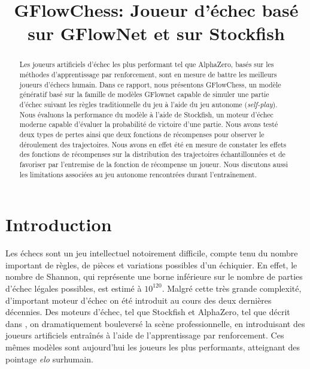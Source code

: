 \documentclass[11pt]{article}
\title{GFlowChess: Joueur d'échec basé sur GFlowNet et sur Stockfish}
\author[1]{\nameemail{Yizhan Li}{yizhan.li@umontreal.ca}}
\author[1]{\nameemail{Olivier
    Déry-Prévost}{olivier.dery-prevost@umontreal.ca}}
\author[1]{\nameemail{Sidya Galakho}{sidya.galakho@umontreal.ca}}
\author[1]{\nameemail{Simon Théorêt}{simon.theoret.1@umontreal.ca}}
\affil[1]{Université de Montréal}
\begin{document}
\maketitle


\begin{abstract}
  Les joueurs artificiels d'échec les plus performant tel que
  AlphaZero, basés sur les méthodes d'apprentissage par renforcement,
  sont en mesure de battre les meilleurs joueurs d'échecs humain.
  Dans ce rapport, nous présentons GFlowChess, un modèle génératif
  basé sur la famille de modèles GFlownet capable de simuler une
  partie d'échec suivant les règles traditionnelle du jeu à l'aide du
  jeu autonome (\textit{self-play}). Nous évaluons la performance du
  modèle à l'aide de Stockfish, un moteur d'échec moderne capable
  d'évaluer la probabilité de victoire d'une partie. Nous avons testé
  deux types de pertes ainsi que deux fonctions de récompenses pour
  observer le déroulement des trajectoires. Nous avons en effet été en
  mesure de constater les effets des fonctions de récompenses sur la
  distribution des trajectoires échantillonnées et de favoriser par
  l'entremise de la fonction de récompense un joueur. Nous discutons
  aussi les limitations associées au jeu autonome rencontrées durant
  l'entraînement.
\end{abstract}

\section*{Introduction}
Les échecs sont un jeu intellectuel notoirement difficile, compte tenu
du nombre important de règles, de pièces et variations possibles d'un
échiquier. En effet, le nombre de Shannon, qui représente une borne
inférieure sur le nombre de parties d'échec légales possibles, est
estimé à $10^{120}$. Malgré cette très grande complexité, d'important
moteur d'échec on été introduit au cours des deux dernières
décennies. Des moteurs d'échec, tel que Stockfish et AlphaZero, tel
que décrit dans \citet{alphazero}, on dramatiquement bouleversé la
scène professionnelle, en introduisant des joueurs artificiels
entraînés à l'aide de l'apprentissage par renforcement. Ces mêmes
modèles sont aujourd'hui les joueurs les plus performants, atteignant
des pointage \textit{elo} surhumain.
\end{document}
